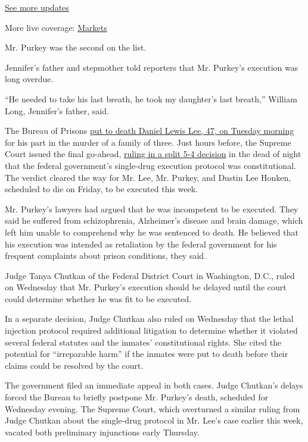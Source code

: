 \href{https://www.nytimes.com/2020/08/01/world/coronavirus-covid-19.html?action=click\&pgtype=Article\&state=default\&region=MAIN_CONTENT_1\&context=storylines_live_updates}{See
more updates}

More live coverage:
\href{https://www.nytimes.com/live/2020/07/31/business/stock-market-today-coronavirus?action=click\&pgtype=Article\&state=default\&region=MAIN_CONTENT_1\&context=storylines_live_updates}{Markets}

Mr. Purkey was the second on the list.

Jennifer's father and stepmother told reporters that Mr. Purkey's
execution was long overdue.

``He needed to take his last breath, he took my daughter's last
breath,'' William Long, Jennifer's father, said.

The Bureau of Prisons
\href{https://www.nytimes.com/2020/07/14/us/politics/daniel-lewis-lee-execution-crime.html}{put
to death Daniel Lewis Lee, 47, on Tuesday morning} for his part in the
murder of a family of three. Just hours before, the Supreme Court issued
the final go-ahead,
\href{https://www.nytimes.com/2020/07/13/us/politics/federal-execution.html}{ruling
in a split 5-4 decision} in the dead of night that the federal
government's single-drug execution protocol was constitutional. The
verdict cleared the way for Mr. Lee, Mr. Purkey, and Dustin Lee Honken,
scheduled to die on Friday, to be executed this week.

Mr. Purkey's lawyers had argued that he was incompetent to be executed.
They said he suffered from schizophrenia, Alzheimer's disease and brain
damage, which left him unable to comprehend why he was sentenced to
death. He believed that his execution was intended as retaliation by the
federal government for his frequent complaints about prison conditions,
they said.

Judge Tanya Chutkan of the Federal District Court in Washington, D.C.,
ruled on Wednesday that Mr. Purkey's execution should be delayed until
the court could determine whether he was fit to be executed.

In a separate decision, Judge Chutkan also ruled on Wednesday that the
lethal injection protocol required additional litigation to determine
whether it violated several federal statutes and the inmates'
constitutional rights. She cited the potential for ``irreparable harm''
if the inmates were put to death before their claims could be resolved
by the court.

The government filed an immediate appeal in both cases. Judge Chutkan's
delays forced the Bureau to briefly postpone Mr. Purkey's death,
scheduled for Wednesday evening. The Supreme Court, which overturned a
similar ruling from Judge Chutkan about the single-drug protocol in Mr.
Lee's case earlier this week, vacated both preliminary injunctions early
Thursday.

